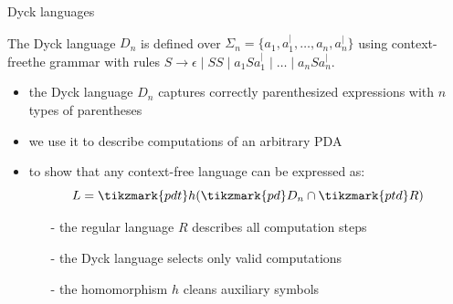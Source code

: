 \documentclass[handout]{beamer}
\begin{document}
\begin{frame}{Dyck languages}

    \begin{definition}
        The \alert{Dyck language} $D_n$ is defined over $\Sigma_n=\{a_1, a^|_1,\ldots,a_n, a^|_n\}$ using context-freethe grammar with rules $S\rightarrow \epsilon\mid SS\mid a_1Sa_1^| \mid \ldots \mid a_nSa_n^|$.
    \end{definition}
        
    \begin{itemize}
        \item the Dyck language $D_n$ captures correctly parenthesized expressions with $n$ types of parentheses
        \item we use it to describe computations of an arbitrary PDA
        \item to show that any context-free language can be expressed as:
        $$
        L = \tikzmark{pdt}h(\tikzmark{pd}D_n\cap \tikzmark{ptd}R)
        $$
        \vspace{-6pt}
        \begin{itemize}
            \item[-] the regular language $R$ describes all computation steps
            \item[-] the Dyck language selects only valid computations
            \item[-] the homomorphism $h$ cleans auxiliary symbols
        \end{itemize}
    \end{itemize}
    
\end{frame}
\end{document}
